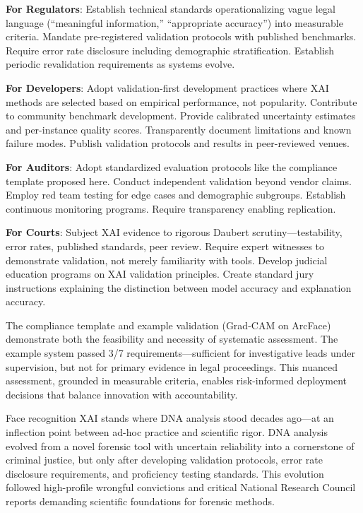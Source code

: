 \textbf{For Regulators}: Establish technical standards operationalizing vague legal language (``meaningful information,'' ``appropriate accuracy'') into measurable criteria. Mandate pre-registered validation protocols with published benchmarks. Require error rate disclosure including demographic stratification. Establish periodic revalidation requirements as systems evolve.

\textbf{For Developers}: Adopt validation-first development practices where XAI methods are selected based on empirical performance, not popularity. Contribute to community benchmark development. Provide calibrated uncertainty estimates and per-instance quality scores. Transparently document limitations and known failure modes. Publish validation protocols and results in peer-reviewed venues.

\textbf{For Auditors}: Adopt standardized evaluation protocols like the compliance template proposed here. Conduct independent validation beyond vendor claims. Employ red team testing for edge cases and demographic subgroups. Establish continuous monitoring programs. Require transparency enabling replication.

\textbf{For Courts}: Subject XAI evidence to rigorous Daubert scrutiny—testability, error rates, published standards, peer review. Require expert witnesses to demonstrate validation, not merely familiarity with tools. Develop judicial education programs on XAI validation principles. Create standard jury instructions explaining the distinction between model accuracy and explanation accuracy.

The compliance template and example validation (Grad-CAM on ArcFace) demonstrate both the feasibility and necessity of systematic assessment. The example system passed 3/7 requirements—sufficient for investigative leads under supervision, but not for primary evidence in legal proceedings. This nuanced assessment, grounded in measurable criteria, enables risk-informed deployment decisions that balance innovation with accountability.

Face recognition XAI stands where DNA analysis stood decades ago—at an inflection point between ad-hoc practice and scientific rigor. DNA analysis evolved from a novel forensic tool with uncertain reliability into a cornerstone of criminal justice, but only after developing validation protocols, error rate disclosure requirements, and proficiency testing standards. This evolution followed high-profile wrongful convictions and critical National Research Council reports demanding scientific foundations for forensic methods.

